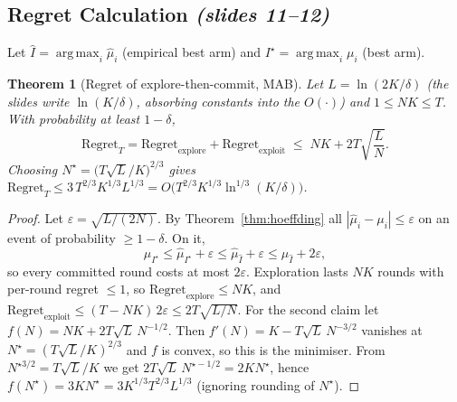 \documentclass[11pt,a4paper]{article}
\newcommand{\Reg}{\mathrm{Regret}}
\DeclareMathOperator*{\argmax}{arg\,max}
\newcommand{\slides}[1]{\emph{(slides #1)}}
\theoremstyle{plain}
\newtheorem{theorem}{Theorem}[section]
\theoremstyle{definition}
\theoremstyle{remark}
\begin{document}
\subsection{Regret Calculation \slides{11--12}}

Let $\hat I=\argmax_i\hat\mu_i$ (empirical best arm) and $I^\star=\argmax_i\mu_i$ (best arm).

\begin{theorem}[Regret of explore-then-commit, MAB]\label{thm:ec-mab}
Let $L=\ln(2K/\delta)$ (the slides write $\ln(K/\delta)$, absorbing constants into the $O(\cdot)$) and $1\le NK\le T$. With probability at least $1-\delta$,
\[
 \Reg_T=\Reg_{\mathrm{explore}}+\Reg_{\mathrm{exploit}}\;\le\; NK+2T\sqrt{\frac{L}{N}} .
\]
Choosing $N^\star=\bigl(T\sqrt{L}/K\bigr)^{2/3}$ gives
$\Reg_T\le 3\,T^{2/3}K^{1/3}L^{1/3}=O\bigl(T^{2/3}K^{1/3}\ln^{1/3}(K/\delta)\bigr)$.
\end{theorem}
\begin{proof}
Let $\varepsilon=\sqrt{L/(2N)}$. By Theorem~\ref{thm:hoeffding} all $|\hat\mu_i-\mu_i|\le\varepsilon$ on an event of probability $\ge1-\delta$. On it,
\[
 \mu_{I^\star}\le\hat\mu_{I^\star}+\varepsilon\le\hat\mu_{\hat I}+\varepsilon\le\mu_{\hat I}+2\varepsilon ,
\]
so every committed round costs at most $2\varepsilon$. Exploration lasts $NK$ rounds with per-round regret $\le1$, so
$\Reg_{\mathrm{explore}}\le NK$, and $\Reg_{\mathrm{exploit}}\le(T-NK)\,2\varepsilon\le 2T\sqrt{L/N}$.
For the second claim let $f(N)=NK+2T\sqrt L\,N^{-1/2}$. Then $f'(N)=K-T\sqrt L\,N^{-3/2}$ vanishes at $N^\star=(T\sqrt L/K)^{2/3}$
and $f$ is convex, so this is the minimiser. From $N^{\star3/2}=T\sqrt L/K$ we get $2T\sqrt L\,N^{\star-1/2}=2KN^\star$, hence
$f(N^\star)=3KN^\star=3K^{1/3}T^{2/3}L^{1/3}$ (ignoring rounding of $N^\star$).
\end{proof}
\end{document}

